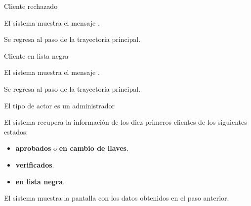 {\begin{trayectoriaAlternativa}
  \end{trayectoriaAlternativa}

  \begin{trayectoriaAlternativa}
    {Cliente rechazado}

    \item El sistema muestra el mensaje
      .

    \item Se regresa al paso  de la trayectoria
      principal.

  \end{trayectoriaAlternativa}

  \begin{trayectoriaAlternativa}
    {Cliente en lista negra}

    \item El sistema muestra el mensaje
      .

    \item Se regresa al paso  de la trayectoria
      principal.

  \end{trayectoriaAlternativa}

  \begin{trayectoriaAlternativa}[ta:administrador]
    {El tipo de actor es un administrador}

    \item El sistema recupera la información de los diez primeros clientes
      de los siguientes estados:
      \begin{itemize}
        \item \textbf{aprobados} o \textbf{en cambio de llaves}.
        \item \textbf{verificados}.
        \item \textbf{en lista negra}.
      \end{itemize}

    \item El sistema muestra la pantalla
       con los datos obtenidos en el paso
      anterior.

  \end{trayectoriaAlternativa}
}
